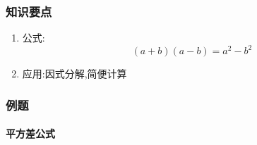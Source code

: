 \documentclass[cn,blue,12pt]{elegantbook}
\begin{document}
\subsubsection{知识要点}%
\label{ssub:知识要点}

\begin{enumerate}
    \item 公式:
        \begin{equation}
            (a+b)(a-b)=a^2-b^2
        \end{equation}
    \item 应用:因式分解,简便计算
\end{enumerate}

\subsubsection{例题}%
\label{ssub:例题}

\paragraph{平方差公式}%
\end{document}
